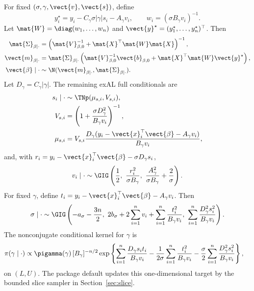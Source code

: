 For fixed $(\sigma,\gamma,\vect{v},\vect{s})$, define
\begin{equation}
y_i^\star=y_i-C_\gamma\sigma|\gamma|s_i-A_\gamma v_i,\qquad
w_i=(\sigma B_\gamma v_i)^{-1}.
\end{equation}
Let $\mat{W}=\diag(w_1,\ldots,w_n)$ and
$\vect{y}^\star=(y_1^\star,\ldots,y_n^\star)^\top$. Then
\begin{align}
\mat{\Sigma}_{\beta\mid\cdot}
&=\left(\mat{V}_{\beta,0}^{-1}+\mat{X}^\top\mat{W}\mat{X}\right)^{-1},\\
\vect{m}_{\beta\mid\cdot}
&=\mat{\Sigma}_{\beta\mid\cdot}
\left(\mat{V}_{\beta,0}^{-1}\vect{b}_{\beta,0}+\mat{X}^\top\mat{W}\vect{y}^\star\right),\\
\vect{\beta}\mid\cdot
&\sim\N(\vect{m}_{\beta\mid\cdot},\mat{\Sigma}_{\beta\mid\cdot}).
\label{eq:static_beta_cond}
\end{align}
Let $D_\gamma=C_\gamma|\gamma|$. The remaining exAL full conditionals are
\begin{align}
s_i\mid\cdot
&\sim \TNp(\mu_{s,i},V_{s,i}),\\
V_{s,i}
&=\left(1+\frac{\sigma D_\gamma^2}{B_\gamma v_i}\right)^{-1},\\
\mu_{s,i}
&=V_{s,i}\frac{D_\gamma(y_i-\vect{x}_i^\top\vect{\beta}-A_\gamma v_i)}
{B_\gamma v_i},
\label{eq:static_exal_s_cond}
\end{align}
and, with $r_i=y_i-\vect{x}_i^\top\vect{\beta}-\sigma D_\gamma s_i$,
\begin{equation}
v_i\mid\cdot
\sim
\GIG\left(
\frac{1}{2},\
\frac{r_i^2}{\sigma B_\gamma},\
\frac{A_\gamma^2}{\sigma B_\gamma}+\frac{2}{\sigma}
\right).
\label{eq:static_exal_v_cond}
\end{equation}
For fixed $\gamma$, define $t_i=y_i-\vect{x}_i^\top\vect{\beta}-A_\gamma v_i$.
Then
\begin{equation}
\sigma\mid\cdot
\sim
\GIG\left(
-a_\sigma-\frac{3n}{2},\
2b_\sigma+2\sum_{i=1}^n v_i+\sum_{i=1}^n\frac{t_i^2}{B_\gamma v_i},\
\sum_{i=1}^n\frac{D_\gamma^2s_i^2}{B_\gamma v_i}
\right).
\label{eq:static_exal_sigma_cond}
\end{equation}
The nonconjugate conditional kernel for $\gamma$ is
\begin{align}
\pi(\gamma\mid\cdot)
&\propto
\pigamma(\gamma)\,[B_\gamma]^{-n/2}
\exp\left\{
\sum_{i=1}^n\frac{D_\gamma s_it_i}{B_\gamma v_i}
-\frac{1}{2\sigma}\sum_{i=1}^n\frac{t_i^2}{B_\gamma v_i}
-\frac{\sigma}{2}\sum_{i=1}^n\frac{D_\gamma^2s_i^2}{B_\gamma v_i}
\right\},
\label{eq:static_exal_gamma_cond}
\end{align}
on $(L,U)$. The package default updates this one-dimensional target by the
bounded slice sampler in Section~\ref{sec:slice}.

